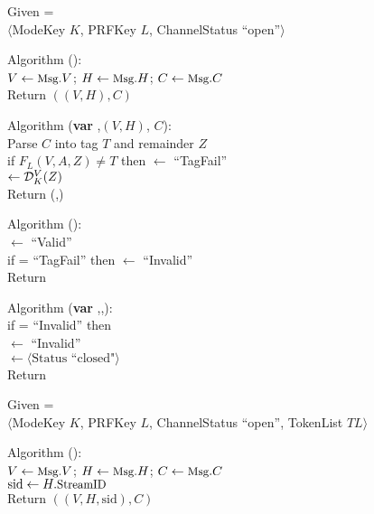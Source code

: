 \begin{figure}
{
Given =\\[-0.5ex]
\nudge\nudge$\langle$ModeKey $K$, PRFKey $L$, ChannelStatus
``open''$\rangle$ 

\medskip
Algorithm ():\\
\nudge $V \gets \textrm{\small Msg}.V$; $H \gets \textrm{\small Msg}.H$; $C \gets
\textrm{\small Msg}.C$\\
\nudge Return $\left((V, H),C\right)$

\medskip
Algorithm ({\bf var} ,$(V,H)$, $C$):\\
\nudge Parse $C$ into tag $T$ and remainder $Z$\\ 
\nudge if $F_L(V,A,Z) \neq T$ then  $\gets$ ``TagFail''\\
\nudge{} $\gets \mathcal{D}_K^{V}(Z)$\\
\nudge Return (,)

\medskip
Algorithm ():\\
\nudge {} $\gets$ ``Valid''\\
\nudge if  =  ``TagFail'' then  $\gets$ ``Invalid''\\
\nudge Return 

\medskip
Algorithm ({\bf var} ,,):\\
\nudge if  = ``Invalid'' then \\
\nudge\nudge {} $\gets$ ``Invalid'' \\
\nudge\nudge {} $\gets \langle
\mbox{Status ``closed"} \rangle$\\
\nudge Return 
}
%
{
Given =\\[-0.5ex]
\nudge\nudge $\langle$ModeKey $K$, PRFKey $L$, ChannelStatus ``open'',
TokenList $ TL\rangle$

\medskip
Algorithm ():\\
\nudge $V \gets \textrm{\small Msg}.V$; $H \gets \textrm{\small Msg}.H$; $C \gets \textrm{\small Msg}.C$\\
\nudge $\mathrm{sid} \gets H.\textrm{\small StreamID}$\\
\nudge Return $\left((V, H, \mathrm{sid}),C\right)$

}
\end{figure}
